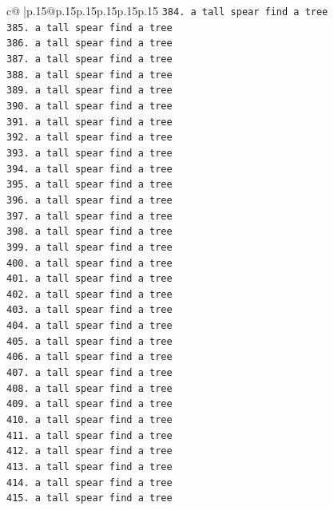 \documentclass{article}
\begin{document}
{\begin{supertabular}{c@{$\;$}|p{.15\linewidth}@{}p{.15\linewidth}p{.15\linewidth}p{.15\linewidth}p{.15\linewidth}p{.15\linewidth}}
{{{\texttt{384. a tall spear find a tree} \\
\texttt{385. a tall spear find a tree} \\
\texttt{386. a tall spear find a tree} \\
\texttt{387. a tall spear find a tree} \\
\texttt{388. a tall spear find a tree} \\
\texttt{389. a tall spear find a tree} \\
\texttt{390. a tall spear find a tree} \\
\texttt{391. a tall spear find a tree} \\
\texttt{392. a tall spear find a tree} \\
\texttt{393. a tall spear find a tree} \\
\texttt{394. a tall spear find a tree} \\
\texttt{395. a tall spear find a tree} \\
\texttt{396. a tall spear find a tree} \\
\texttt{397. a tall spear find a tree} \\
\texttt{398. a tall spear find a tree} \\
\texttt{399. a tall spear find a tree} \\
\texttt{400. a tall spear find a tree} \\
\texttt{401. a tall spear find a tree} \\
\texttt{402. a tall spear find a tree} \\
\texttt{403. a tall spear find a tree} \\
\texttt{404. a tall spear find a tree} \\
\texttt{405. a tall spear find a tree} \\
\texttt{406. a tall spear find a tree} \\
\texttt{407. a tall spear find a tree} \\
\texttt{408. a tall spear find a tree} \\
\texttt{409. a tall spear find a tree} \\
\texttt{410. a tall spear find a tree} \\
\texttt{411. a tall spear find a tree} \\
\texttt{412. a tall spear find a tree} \\
\texttt{413. a tall spear find a tree} \\
\texttt{414. a tall spear find a tree} \\
\texttt{415. a tall spear find a tree} \\
}}}
\end{supertabular}}
\end{document}
